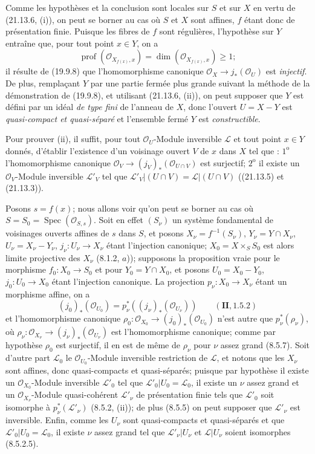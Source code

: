 Comme les hypothèses et la conclusion sont locales sur $S$ et sur $X$ en vertu de
(21.13.6, (i)), on peut se borner au cas où $S$ et $X$ sont affines, $f$ étant donc de
présentation finie. Puisque les fibres de $f$ sont régulières, l'hypothèse sur $Y$
entraîne que, pour tout point $x\in Y$, on a
\[
  \operatorname{prof}(\mathcal O_{X_{f(x)},x})
  =\dim(\mathcal O_{X_{f(x)},x})\geq1;
\]
il résulte de (19.9.8) que l'homomorphisme canonique
$\mathcal O_X\to j_*(\mathcal O_U)$ est \emph{injectif}. De plus, remplaçant $Y$ par
une partie fermée plus grande suivant la méthode de la démonstration de (19.9.8), et
utilisant (21.13.6, (ii)), on peut supposer que $Y$ est défini par un idéal \emph{de
type fini} de l'anneau de $X$, donc l'ouvert $U=X-Y$ est \emph{quasi-compact et
quasi-séparé} et l'ensemble fermé $Y$ est \emph{constructible}.

Pour prouver (ii), il suffit, pour tout $\mathcal O_U$-Module inversible $\mathscr L$
et tout point $x\in Y$ donnés, d'établir l'existence d'un voisinage ouvert $V$ de $x$
dans $X$ tel que : $1^{\mathrm o}$ l'homomorphisme canonique
$\mathcal O_V\to(j_V)_*(\mathcal O_{U\cap V})$ est surjectif;
$2^{\mathrm o}$ il existe un $\mathcal O_V$-Module inversible $\mathscr L'_V$ tel que
$\mathscr L'_V|(U\cap V)=\mathscr L|(U\cap V)$ ((21.13.5) et (21.13.3)).

Posons $s=f(x)$; nous allons voir qu'on peut se borner au cas où
$S=S_0=\operatorname{Spec}(\mathcal O_{S,s})$. Soit en effet $(S_\nu)$ un système
fondamental de voisinages ouverts affines de $s$ dans $S$, et posons
$X_\nu=f^{-1}(S_\nu)$, $Y_\nu=Y\cap X_\nu$, $U_\nu=X_\nu-Y_\nu$,
$j_\nu:U_\nu\to X_\nu$ étant l'injection canonique; $X_0=X\times_S S_0$ est alors
limite projective des $X_\nu$ (8.1.2, $a$)); supposons la proposition vraie pour le
morphisme $f_0:X_0\to S_0$ et pour $Y_0=Y\cap X_0$, et posons $U_0=X_0-Y_0$,
$j_0:U_0\to X_0$ étant l'injection canonique. La projection
$p_\nu:X_0\to X_\nu$ étant un morphisme affine, on a
\[
  (j_0)_*(\mathcal O_{U_0})
  =p_\nu^*((j_\nu)_*(\mathcal O_{U_\nu}))
  \qquad(\mathbf{II}, 1.5.2)
\]
et l'homomorphisme canonique
$\rho_0:\mathcal O_{X_0}\to(j_0)_*(\mathcal O_{U_0})$ n'est autre que
$p_\nu^*(\rho_\nu)$, où
$\rho_\nu:\mathcal O_{X_\nu}\to(j_\nu)_*(\mathcal O_{U_\nu})$ est l'homomorphisme
canonique; comme par hypothèse $\rho_0$ est surjectif, il en est de même de $\rho_\nu$
pour $\nu$ assez grand (8.5.7). Soit d'autre part $\mathscr L_0$ le
$\mathcal O_{U_0}$-Module inversible restriction de $\mathscr L$, et notons que les
$X_\nu$ sont affines, donc quasi-compacts et quasi-séparés; puisque par hypothèse il
existe un $\mathcal O_{X_0}$-Module inversible $\mathscr L'_0$ tel que
$\mathscr L'_0|U_0=\mathscr L_0$, il existe un $\nu$ assez grand et un
$\mathcal O_{X_\nu}$-Module quasi-cohérent $\mathscr L'_\nu$ de présentation finie
tels que $\mathscr L'_0$ soit isomorphe à $p_\nu^*(\mathscr L'_\nu)$ (8.5.2, (ii));
de plus (8.5.5) on peut supposer que $\mathscr L'_\nu$ est inversible. Enfin, comme
les $U_\nu$ sont quasi-compacts et quasi-séparés et que
$\mathscr L'_0|U_0=\mathscr L_0$, il existe $\nu$ assez grand tel que
$\mathscr L'_\nu|U_\nu$ et $\mathscr L|U_\nu$ soient isomorphes (8.5.2.5).

